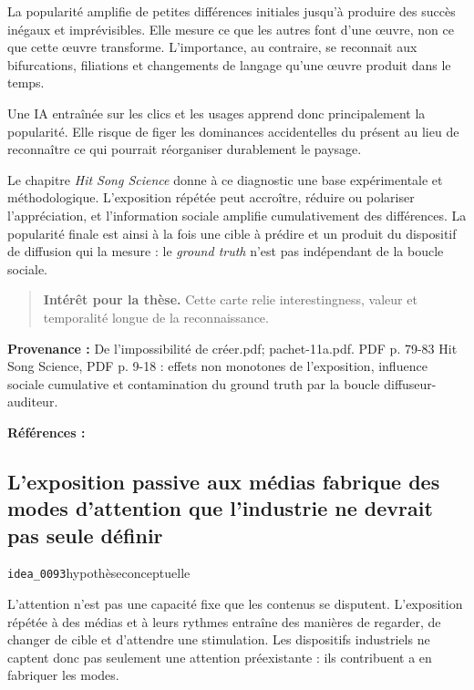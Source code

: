 \documentclass[10pt,a4paper]{article}
\begin{document}
La popularité amplifie de petites différences initiales jusqu'à produire des succès inégaux et imprévisibles. Elle mesure ce que les autres font d'une œuvre, non ce que cette œuvre transforme. L'importance, au contraire, se reconnait aux bifurcations, filiations et changements de langage qu'une œuvre produit dans le temps.

Une IA entraînée sur les clics et les usages apprend donc principalement la popularité. Elle risque de figer les dominances accidentelles du présent au lieu de reconnaître ce qui pourrait réorganiser durablement le paysage.

Le chapitre \emph{Hit Song Science} donne à ce diagnostic une base expérimentale et méthodologique. L'exposition répétée peut accroître, réduire ou polariser l'appréciation, et l'information sociale amplifie cumulativement des différences. La popularité finale est ainsi à la fois une cible à prédire et un produit du dispositif de diffusion qui la mesure : le \emph{ground truth} n'est pas indépendant de la boucle sociale.

\begin{quote}
\textbf{Intérêt pour la thèse.} Cette carte relie interestingness, valeur et temporalité longue de la reconnaissance.
\end{quote}
{\footnotesize\color{metadata}\textbf{Provenance :} De l'impossibilité de créer.pdf; pachet-11a.pdf. PDF p. 79-83 Hit Song Science, PDF p. 9-18 : effets non monotones de l'exposition, influence sociale cumulative et contamination du ground truth par la boucle diffuseur-auditeur.\par}
{\footnotesize\color{metadata}\textbf{Références :} \parencite{pachet2011hitsong}\par}

\subsection{L'exposition passive aux médias fabrique des modes d'attention que l'industrie ne devrait pas seule définir}
{\small\color{metadata} \texttt{idea\_0093}\quad\textbullet\quad hypothèse\quad\textbullet\quad conceptuelle\par}

L'attention n'est pas une capacité fixe que les contenus se disputent. L'exposition répétée à des médias et à leurs rythmes entraîne des manières de regarder, de changer de cible et d'attendre une stimulation. Les dispositifs industriels ne captent donc pas seulement une attention préexistante : ils contribuent a en fabriquer les modes.
\end{document}
